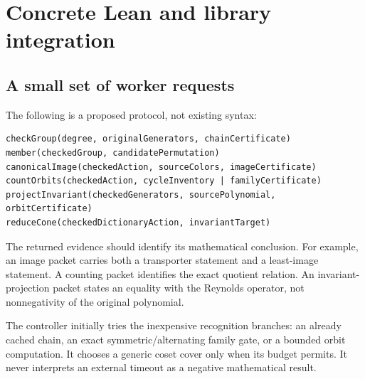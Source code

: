\section{Concrete Lean and library integration}
\label{sec:integration}
\subsection{A small set of worker requests}
The following is a proposed protocol, not existing  syntax:
\begin{lstlisting}
checkGroup(degree, originalGenerators, chainCertificate)
member(checkedGroup, candidatePermutation)
canonicalImage(checkedAction, sourceColors, imageCertificate)
countOrbits(checkedAction, cycleInventory | familyCertificate)
projectInvariant(checkedGenerators, sourcePolynomial, orbitCertificate)
reduceCone(checkedDictionaryAction, invariantTarget)
\end{lstlisting}
The returned evidence should identify its mathematical conclusion. For example, an image packet carries both a transporter statement and a least-image statement. A counting packet identifies the exact quotient relation. An invariant-projection packet states an equality with the Reynolds operator, not nonnegativity of the original polynomial.

The controller initially tries the inexpensive recognition branches: an already cached chain, an exact symmetric/alternating family gate, or a bounded orbit computation. It chooses a generic coset cover only when its budget permits. It never interprets an external timeout as a negative mathematical result.

